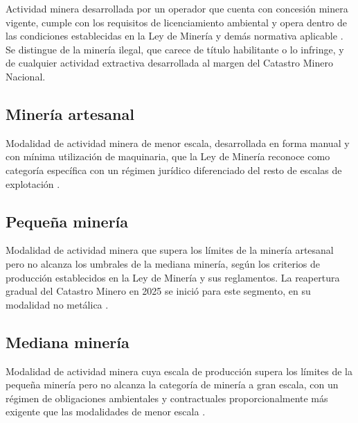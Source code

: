Actividad minera desarrollada por un operador que cuenta con concesión minera vigente, cumple con los requisitos de licenciamiento ambiental y opera dentro de las condiciones establecidas en la Ley de Minería y demás normativa aplicable \parencite{ley_mineria_2025}. Se distingue de la minería ilegal, que carece de título habilitante o lo infringe, y de cualquier actividad extractiva desarrollada al margen del Catastro Minero Nacional.

\subsection{Minería artesanal}

Modalidad de actividad minera de menor escala, desarrollada en forma manual y con mínima utilización de maquinaria, que la Ley de Minería reconoce como categoría específica con un régimen jurídico diferenciado del resto de escalas de explotación \parencite{ley_mineria_2025}.

\subsection{Pequeña minería}

Modalidad de actividad minera que supera los límites de la minería artesanal pero no alcanza los umbrales de la mediana minería, según los criterios de producción establecidos en la Ley de Minería y sus reglamentos. La reapertura gradual del Catastro Minero en 2025 se inició para este segmento, en su modalidad no metálica \parencite{ley_mineria_2025,arcom_resolucion_0029_2025}.

\subsection{Mediana minería}

Modalidad de actividad minera cuya escala de producción supera los límites de la pequeña minería pero no alcanza la categoría de minería a gran escala, con un régimen de obligaciones ambientales y contractuales proporcionalmente más exigente que las modalidades de menor escala \parencite{ley_mineria_2025}.

